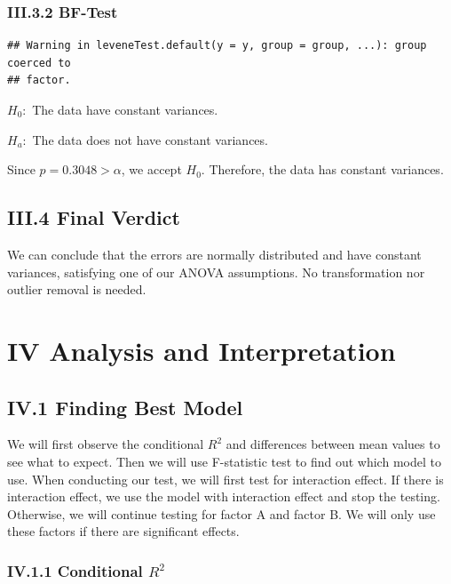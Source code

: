 \documentclass[
]{article}
\begin{document}
\subsubsection{III.3.2 BF-Test}\label{iii.3.2-bf-test}

\begin{verbatim}
## Warning in leveneTest.default(y = y, group = group, ...): group coerced to
## factor.
\end{verbatim}

\(H_0:\) The data have constant variances.

\(H_a:\) The data does not have constant variances.

Since \(p = 0.3048 > \alpha\), we accept \(H_0\). Therefore, the data
has constant variances.

\subsection{III.4 Final Verdict}\label{iii.4-final-verdict}

We can conclude that the errors are normally distributed and have
constant variances, satisfying one of our ANOVA assumptions. No
transformation nor outlier removal is needed.

\section{IV Analysis and
Interpretation}\label{iv-analysis-and-interpretation}

\subsection{IV.1 Finding Best Model}\label{iv.1-finding-best-model}

We will first observe the conditional \(R^2\) and differences between
mean values to see what to expect. Then we will use F-statistic test to
find out which model to use. When conducting our test, we will first
test for interaction effect. If there is interaction effect, we use the
model with interaction effect and stop the testing. Otherwise, we will
continue testing for factor A and factor B. We will only use these
factors if there are significant effects.

\subsubsection{\texorpdfstring{IV.1.1 Conditional
\(R^2\)}{IV.1.1 Conditional R\^{}2}}\label{iv.1.1-conditional-r2}
\end{document}
